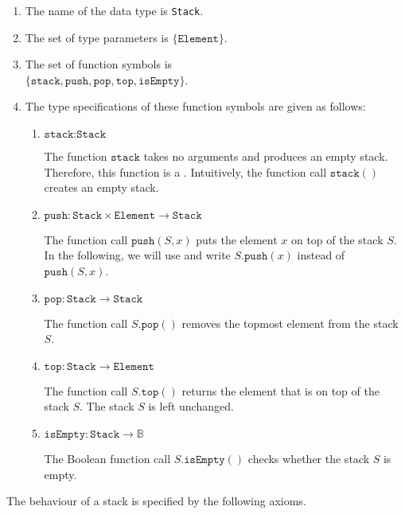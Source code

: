 \begin{enumerate}
\item The name of the data type is \texttt{Stack}.
\item The set of type parameters is $\{ \texttt{Element} \}$.
\item The set of function symbols is \\[0.2cm]
      \hspace*{1.3cm} 
      $\bigl\{ \texttt{stack}, \texttt{push}, \texttt{pop}, \texttt{top}, \texttt{isEmpty} \bigr\}$.
\item The type specifications of these function symbols are given as follows:
      \begin{enumerate}
      \item $\texttt{stack}: \texttt{Stack}$

            The function $\texttt{stack}$ takes no arguments and produces an empty stack.
            Therefore, this function is a .  Intuitively, the function call $\texttt{stack}()$ 
            creates an empty stack.
      \item $\texttt{push}: \texttt{Stack} \times \texttt{Element} \rightarrow \texttt{Stack}$

            The function call $\texttt{push}(S,x)$ puts the element $x$ on top of the stack $S$.  In
            the following, we will use  and write 
            $S.\texttt{push}(x)$ instead of $\texttt{push}(S,x)$.
      \item $\texttt{pop}: \texttt{Stack}  \rightarrow \texttt{Stack}$

            The function call $S.\texttt{pop}()$ removes the topmost element from the stack $S$.
      \item $\texttt{top}: \texttt{Stack} \rightarrow \texttt{Element}$

            The function call $S.\texttt{top}()$ returns the element that is on top of the stack $S$. 
            The stack $S$ is left unchanged.
     \item $\texttt{isEmpty}: \texttt{Stack} \rightarrow \mathbb{B}$

            The Boolean function call $S.\texttt{isEmpty}()$ checks whether the stack $S$ is empty.
      \end{enumerate}
\end{enumerate}
The behaviour of a stack is specified by the following axioms.
